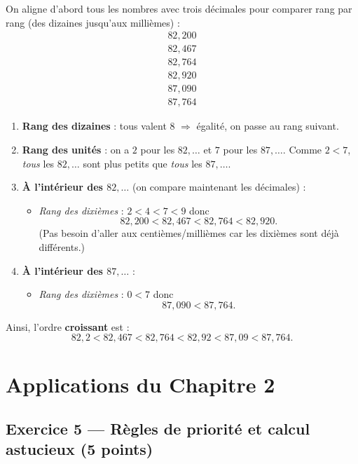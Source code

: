 \documentclass[answers]{exam}
\begin{document}
\begin{solution}
On aligne d'abord tous les nombres avec trois décimales pour comparer rang par rang (des dizaines jusqu’aux millièmes) :
\[
\begin{array}{r}
82,200\\
82,467\\
82,764\\
82,920\\
87,090\\
87,764
\end{array}
\]

\begin{enumerate}
  \item \textbf{Rang des dizaines} : tous valent \(8\) \(\Rightarrow\) égalité, on passe au rang suivant.
  \item \textbf{Rang des unités} : on a \(2\) pour les \(82,\dots\) et \(7\) pour les \(87,\dots\). Comme \(2<7\), \emph{tous} les \(82,\dots\) sont plus petits que \emph{tous} les \(87,\dots\).
  \item \textbf{À l’intérieur des \(82,\dots\)} (on compare maintenant les décimales) :
    \begin{itemize}
      \item \emph{Rang des dixièmes} : \(2<4<7<9\) donc
      \[
      82,200 < 82,467 < 82,764 < 82,920.
      \]
      (Pas besoin d’aller aux centièmes/millièmes car les dixièmes sont déjà différents.)
    \end{itemize}
  \item \textbf{À l’intérieur des \(87,\dots\)} :
    \begin{itemize}
      \item \emph{Rang des dixièmes} : \(0<7\) donc
      \[
      87,090 < 87,764.
      \]
    \end{itemize}
\end{enumerate}

Ainsi, l’ordre \textbf{croissant} est :
\[
\boxed{82,2 < 82,467 < 82,764 < 82,92 < 87,09 < 87,764}.
\]
\end{solution}

\section*{Applications du Chapitre 2}

\subsection*{Exercice 5 — Règles de priorité et calcul astucieux (5 points)}
\end{document}
